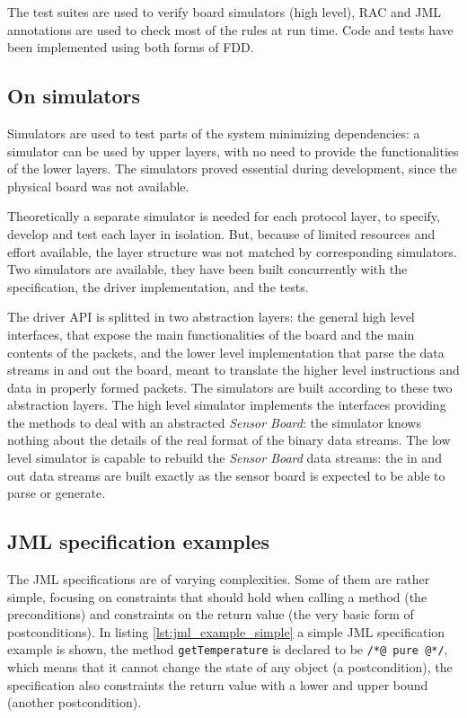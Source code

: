 \documentclass[english]{lni}
\newcommand{\lil}[1]{\texttt{\lstinline|#1|}}
\newcommand{\SB}{\emph{Sensor Board}\xspace}
\begin{document}
The test suites are used to verify board simulators (high level), RAC and JML annotations are used to check most of the rules at run time.
Code and tests have been implemented using both forms of FDD.



\subsection{On simulators}
\label{subsec:on_simulators}

Simulators are used to test parts of the system minimizing dependencies: a simulator can be used by upper layers, with no need to provide the functionalities of the lower layers. 
The simulators proved essential during development, since the physical board was not available.

Theoretically a separate simulator is needed for each protocol layer, to specify, develop and test each layer in isolation.  
But, because of limited resources and effort available, the layer structure was not matched by corresponding simulators.
Two simulators are available, they have been built concurrently with the specification, the driver implementation, and the tests.

The driver API is splitted in two abstraction layers: the general high level interfaces, that expose the main functionalities of the board and the main contents of the packets, and the lower level implementation that parse the data streams in and out the board, meant to translate the higher level instructions and data in properly formed packets.
The simulators are built according to these two abstraction layers.
The high level simulator implements the interfaces providing the methods to deal with an abstracted \SB: the simulator knows nothing
about the details of the real format of the binary data streams.
The low level simulator is capable to rebuild the \SB data streams: the in and out data streams are built exactly as the sensor board is expected to be able to parse or generate.



\subsection{JML specification examples}
\label{subsec:a_jml_specification_example}

The JML specifications are of varying complexities.  
Some of them are rather simple, focusing on constraints that should hold when calling a method (the preconditions) and constraints on the return value (the very basic form of postconditions). 
In listing \ref{lst:jml_example_simple} a simple JML specification example is shown, the method \lil{getTemperature} is declared to be \lil{/*@ pure @*/}, which means that it cannot change the state of any object (a postcondition), the specification also constraints the return value with a lower and upper bound (another postcondition).
\end{document}

